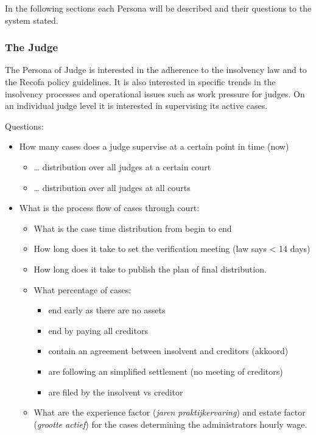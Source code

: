 In the following sections each Persona will be described and their questions to the system stated.

\subsubsection{The Judge}
The Persona of Judge is interested in the adherence to the insolvency law and to the Recofa policy guidelines. It is also interested in specific trends in the insolvency processes and operational issues such as work pressure for judges. On an individual judge level it is interested in supervising its active cases.

Questions:
\begin{itemize}
	\item How many cases does a judge supervise at a certain point in time (now)
	\begin{itemize}
		\item … distribution over all judges at a certain court
		\item … distribution over all judges at all courts
	\end{itemize}
	\item What is the process flow of cases through court: 
	\begin{itemize}
		\item What is the case time distribution from begin to end
		\item How long does it take to set the verification meeting (law says < 14 days)
		\item How long does it take to publish the plan of final distribution.
		\item What percentage of cases:
		\begin{itemize}
			\item end early as there are no assets
			\item end by paying all creditors
			\item contain an agreement between insolvent and creditors (akkoord)
			\item are following an simplified settlement (no meeting of creditors)	
			\item are filed by the insolvent vs creditor
		\end{itemize}
		\item What are the experience factor (\textit{jaren praktijkervaring}) and estate factor (\textit{grootte actief}) for the cases determining the administrators hourly wage.
	\end{itemize}
	

\end{itemize}

